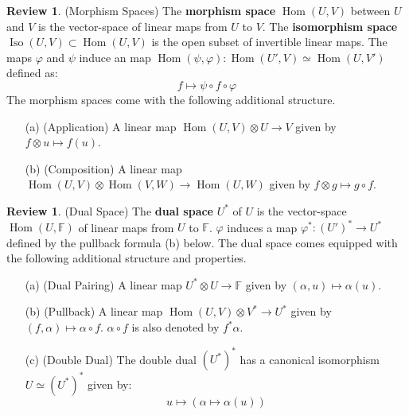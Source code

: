 \documentclass[12pt]{article}
\theoremstyle{definition}
\newtheorem{review}[theorem]{Review}
\numberwithin{equation}{section}
\newcommand{\op}{\operatorname}
\begin{document}
\begin{review} \label{rev:morphism_spaces} (Morphism Spaces) The {\bf morphism space} $\op{Hom}(U,V)$ between $U$ and $V$ is the vector-space of linear maps from $U$ to $V$. The {\bf isomorphism space} $\op{Iso}(U,V) \subset \op{Hom}(U,V)$ is the open subset of invertible linear maps. The maps $\varphi$ and $\psi$ induce an map $\op{Hom}(\psi,\varphi):\op{Hom}(U',V) \simeq \op{Hom}(U,V')$ defined as:
\[
f \mapsto \psi \circ f \circ \varphi
\] 
The morphism spaces come with the following additional structure.

\begin{enumerate} 
	\item[(a)] (Application) A linear map $\op{Hom}(U,V) \otimes U \to V$ given by $f \otimes u \mapsto f(u)$.
	\item[(b)] (Composition) A linear map $\op{Hom}(U,V) \otimes \op{Hom}(V,W) \to \op{Hom}(U,W)$ given by $f \otimes g \mapsto g \circ f$.
\end{enumerate} 
\end{review}

\begin{review} \label{rev:dual_spaces} (Dual Space) The {\bf dual space} $U^*$ of $U$ is the vector-space $\op{Hom}(U,\mathbb{F})$ of linear maps from $U$ to $\mathbb{F}$. $\varphi$ induces a map $\varphi^*:(U')^* \to U^*$ defined by the pullback formula (b) below. The dual space comes equipped with the following additional structure and properties.
\begin{enumerate} 
	\item[(a)] (Dual Pairing) A linear map $U^* \otimes U \to \mathbb{F}$ given by $(\alpha,u) \mapsto \alpha(u)$.
	\item[(b)] (Pullback) A linear map $\op{Hom}(U,V) \otimes V^* \to U^*$ given by $(f,\alpha) \mapsto \alpha \circ f$. $\alpha \circ f$ is also denoted by $f^*\alpha$.
	\item[(c)] (Double Dual) The double dual $(U^*)^*$ has a canonical isomorphism $U \simeq (U^*)^*$ given by:
	\[u \mapsto (\alpha \mapsto \alpha(u))\]
\end{enumerate}
\end{review}
\end{document}
